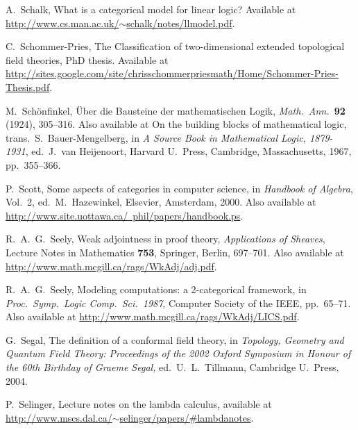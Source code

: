 \documentclass[12pt,twoside,openright]{report}
\begin{document}
\begin{thebibliography}{99}
 A.\ Schalk, What is a categorical model for linear logic?  Available at \hfill \break
\href{http://www.cs.man.ac.uk/~schalk/notes/llmodel.pdf}
{http://www.cs.man.ac.uk/$\sim$schalk/notes/llmodel.pdf}.

 C.\ Schommer-Pries, The Classification of two-dimensional extended topological field theories, PhD thesis. Available at
\href{http://sites.google.com/site/chrisschommerpriesmath/Home/Schommer-Pries-Thesis.pdf}{http://sites.google.com/site/chrisschommerpriesmath/Home/Schommer-Pries-Thesis.pdf}.

 M.\ Sch\"onfinkel, \"Uber die Bausteine der mathematischen Logik, {\sl Math.\ Ann.\ }{\bf 92} (1924), 305--316. Also available at On the building blocks of mathematical logic, trans.\ S.\ Bauer-Mengelberg, in {\sl A Source Book in Mathematical Logic, 1879-1931}, ed.\ J.\ van Heijenoort, Harvard U.\ Press, Cambridge, Massachusetts, 1967, pp.\ 355--366.

 P.\ Scott, Some aspects of categories in computer science, in {\sl Handbook of Algebra}, Vol.\ 2, ed.\ M.\ Hazewinkel, Elsevier, Amsterdam, 2000. Also available at \\
\href{http://www.site.uottawa.ca/~phil/papers/handbook.ps}
{http://www.site.uottawa.ca/~phil/papers/handbook.ps}.

 R.\ A.\ G.\ Seely, Weak adjointness in proof theory,
{\sl Applications of Sheaves}, Lecture Notes in Mathematics {\bf 753}, Springer, Berlin, 697--701.  Also available at \hfill \break
\href{http://www.math.mcgill.ca/rags/WkAdj/adj.pdf}
{http://www.math.mcgill.ca/rags/WkAdj/adj.pdf}.

R.\ A.\ G.\ Seely, Modeling computations: a
2-categorical framework, in {\sl Proc.\ Symp.\ Logic Comp.\ 
Sci.\ 1987}, Computer Society of the IEEE, pp.\ 65--71. Also available at \hfill \break 
\href{http://www.math.mcgill.ca/rags/WkAdj/LICS.pdf}
{http://www.math.mcgill.ca/rags/WkAdj/LICS.pdf}.

 G.\ Segal, The definition of a conformal field theory, in {\sl Topology, Geometry and Quantum Field Theory: Proceedings of the 
2002 Oxford Symposium in Honour of the 60th Birthday of Graeme Segal,} 
ed.\ U.\ L.\ Tillmann, Cambridge U.\ Press, 2004.

 P.\ Selinger, Lecture notes on the lambda calculus, available at \hfill \break
\href{http://www.mscs.dal.ca/~selinger/papers/#lambdanotes}
{http://www.mscs.dal.ca/$\sim$selinger/papers/\#lambdanotes}.


\end{thebibliography}
\end{document}
